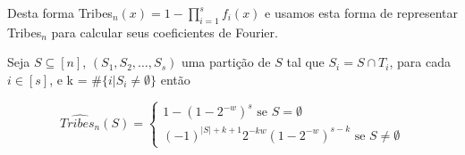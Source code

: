 Desta forma Tribes$_{n}(x) = 1 - \prod_{i = 1}^{s} f_{i}(x)$ e usamos esta forma de representar Tribes$_{n}$ para calcular seus coeficientes de Fourier.

\begin{prop} \label{prop: tribes_fourier_coef}

    Seja $S \subseteq [n]$, $(S_{1}, S_{2}, \dots, S_{s})$ uma partição de $S$ tal que $S_{i} = S \cap T_{i}$, para cada $i \in [s]$, e k = $\#\{i \rvert S_{i} \neq \emptyset\}$ então

    \begin{equation*}
    \widehat{Tribes_{n}}(S) = \begin{cases}
                                   1 - (1 - 2^{-w})^{s} \text{ se } S = \emptyset \\
                                   (-1)^{\lvert S \rvert + k + 1}2^{-kw}(1 - 2^{-w})^{s - k} \text{ se } S \neq \emptyset
                               \end{cases}
    \end{equation*}

\end{prop}

